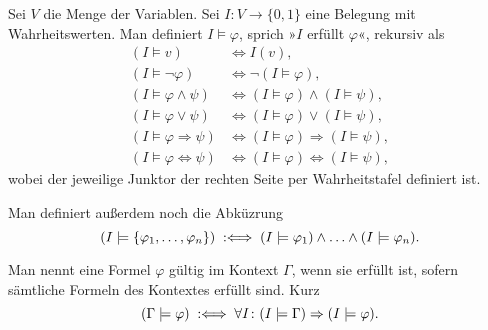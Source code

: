 \begin{Definition}\label{def:sat}\newlinefirst
Sei $V$ die Menge der Variablen. Sei $I\colon V\to\{0,1\}$ eine
Belegung mit Wahrheitswerten. Man definiert $I\models\varphi$,
sprich »$I$ erfüllt $\varphi$«, rekursiv als
\begin{align*}
(I\models v) &\iff I(v),\\
(I\models\neg\varphi) &\iff \neg (I\models\varphi),\\
(I\models \varphi\land\psi) &\iff (I\models\varphi)\land (I\models\psi),\\
(I\models \varphi\lor\psi) &\iff (I\models\varphi)\lor (I\models\psi),\\
(I\models \varphi\Rightarrow\psi) &\iff (I\models\varphi)\Rightarrow (I\models\psi),\\
(I\models \varphi\Leftrightarrow\psi) &\iff (I\models\varphi)\Leftrightarrow (I\models\psi),
\end{align*}
wobei der jeweilige Junktor der rechten Seite per Wahrheitstafel
definiert ist.
\end{Definition}
\begin{Definition}\label{def:sat-context}
Man definiert außerdem noch die Abküzrung
\[(I\models\{\varphi_1,\ldots,\varphi_n\})
\;:\Longleftrightarrow\; (I\models\varphi_1)\land\ldots\land (I\models\varphi_n).\]
\end{Definition}

\newpage
\begin{Definition}%
\label{def:valid}\newlinefirst
Man nennt eine Formel $\varphi$ gültig im Kontext $\Gamma$,
wenn sie erfüllt ist, sofern sämtliche Formeln des Kontextes
erfüllt sind. Kurz
\[(\Gamma\models\varphi) \;:\Longleftrightarrow\; \forall I\colon
(I\models\Gamma) \Rightarrow (I\models\varphi).\]
\end{Definition}

